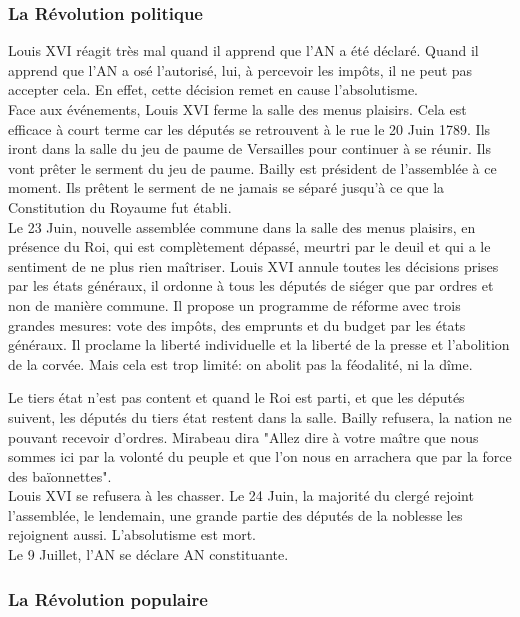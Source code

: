 \documentclass[10pt, a4paper, openany]{book}
\begin{document}
\subsubsection{La Révolution politique}

Louis XVI réagit très mal quand il apprend que l'AN a été déclaré. Quand il apprend que l'AN a osé l'autorisé, lui, à percevoir les impôts, il ne peut pas accepter cela. En effet, cette décision remet en cause l'absolutisme. \\
Face aux événements, Louis XVI ferme la salle des menus plaisirs. Cela est efficace à court terme car les députés se retrouvent à le rue le 20 Juin 1789. Ils iront dans la salle du jeu de paume de Versailles pour continuer à se réunir. Ils vont prêter le serment du jeu de paume. Bailly est président de l'assemblée à ce moment. Ils prêtent le serment de ne jamais se séparé jusqu'à ce que la Constitution du Royaume fut établi. \\
Le 23 Juin, nouvelle assemblée commune dans la salle des menus plaisirs, en présence du Roi, qui est complètement dépassé, meurtri par le deuil et qui a le sentiment de ne plus rien maîtriser. Louis XVI annule toutes les décisions prises par les états généraux, il ordonne à tous les députés de siéger que par ordres et non de manière commune. Il propose un programme de réforme avec trois grandes mesures: vote des impôts, des emprunts et du budget par les états généraux. Il proclame la liberté individuelle et la liberté de la presse et l'abolition de la corvée. Mais cela est trop limité: on abolit pas la féodalité, ni la dîme.


Le tiers état n'est pas content et quand le Roi est parti, et que les députés suivent, les députés du tiers état restent dans la salle. Bailly refusera, la nation ne pouvant recevoir d'ordres. Mirabeau dira "Allez dire à votre maître que nous sommes ici par la volonté du peuple et que l'on nous en arrachera que par la force des baïonnettes". \\
Louis XVI se refusera à les chasser. Le 24 Juin, la majorité du clergé rejoint l'assemblée, le lendemain, une grande partie des députés de la noblesse les rejoignent aussi. L'absolutisme est mort. \\
Le 9 Juillet, l'AN se déclare AN constituante. 

\subsubsection{La Révolution populaire}
\end{document}
